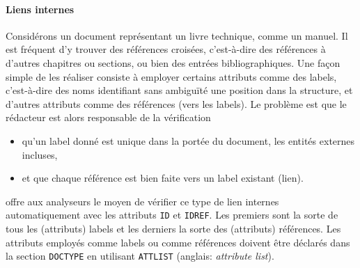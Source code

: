 \paragraph{Liens internes}

Considérons un document représentant un livre technique, comme un
manuel. Il est fréquent d'y trouver des références croisées,
c'est-à-dire des références à d'autres chapitres ou sections, ou bien
des entrées bibliographiques. Une façon simple de les réaliser
consiste à employer certains attributs comme des labels, c'est-à-dire
des noms identifiant sans ambiguïté une position dans la structure, et
d'autres attributs comme des références (vers les labels). Le problème
est que le rédacteur est alors responsable de la vérification
\begin{itemize}

  \item qu'un label donné est unique dans la portée du document, les
    entités externes incluses,

  \item et que chaque référence est bien faite vers un label existant
    (lien).

\end{itemize}
\label{xml_intro_ATTLIST}
\XML offre aux analyseurs le moyen de vérifier ce type de lien
internes automatiquement avec les attributs \texttt{ID} et
\texttt{IDREF}. Les premiers sont la sorte de tous les (attributs)
labels et les derniers la sorte des (attributs) références. Les
attributs employés comme labels ou comme références doivent être
déclarés dans la section \texttt{DOCTYPE} en utilisant
\texttt{ATTLIST} (anglais: \emph{attribute list}).

